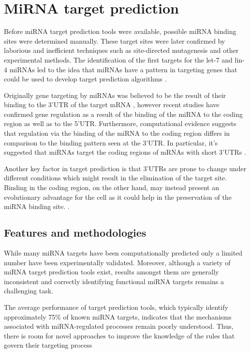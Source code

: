 \section{MiRNA target prediction}
Before miRNA target prediction tools were available, possible miRNA binding sites were
determined manually. These target sites were later confirmed by laborious and inefficient techniques such as site-directed mutagenesis and other experimental methods. The identification of the first targets for the let-7 and lin-4 miRNAs led to the idea that miRNAs have a pattern in targeting genes that could be used to develop target prediction algorithms \cite{first_predictions}.

Originally gene targeting by miRNAs was believed to be the result of their binding to the 3'UTR of the target mRNA \cite{multiple_binds}, however recent studies \cite{grosswendt} have confirmed gene regulation as a result of the binding of the miRNA to the coding region as well as to the 5'UTR. Furthermore, computational evidence suggests that regulation via the binding of the miRNA to the coding region differs in comparison to the binding pattern seen at the 3'UTR. In particular, it's suggested that miRNAs target the coding regions of mRNAs with short 3'UTRs \cite{functional_sites}.

Another key factor in target prediction is that 3'UTRs are prone to change under different conditions which might result in the elimination of the target site. Binding in the coding region, on the other hand, may instead present an evolutionary advantage for the cell as it could help in the preservation of the miRNA binding site. \cite{mirna_targets}. 

\subsection{Features and methodologies}
While many miRNA targets have been computationally predicted only a limited number
have been experimentally validated. Moreover, although a variety of miRNA target prediction tools exist, results amongst them are generally inconsistent and correctly identifying functional miRNA targets remains a challenging task.

The average performance of target prediction tools, which typically identify approximately 75\% of known miRNA targets, indicates that the mechanisms associated with miRNA-regulated processes remain poorly understood. Thus, there is room for novel approaches to improve the knowledge of the rules that govern their targeting process \cite{targeting_rules}

